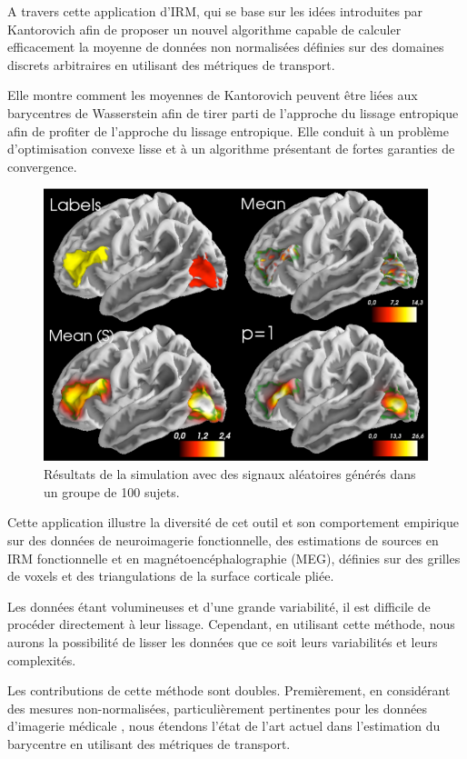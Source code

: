 \documentclass[
    8.2pt,
    a4paper,
    logo,
    twocolumn
]{template}
\begin{document}
    A travers cette application d’IRM, qui se base sur les idées introduites par Kantorovich \citep{KR:58} afin de proposer un nouvel algorithme capable de calculer efficacement la moyenne de données non normalisées définies sur des domaines discrets arbitraires en utilisant des métriques de transport.

    Elle montre comment les moyennes de Kantorovich peuvent être liées aux barycentres de Wasserstein \citep{agueh_barycenters_2011} afin de tirer parti de l'approche du lissage entropique \citep{cuturi_fast_2014} afin de profiter de l'approche du lissage entropique. Elle conduit à un problème d'optimisation convexe lisse et à un algorithme présentant de fortes garanties de convergence.

    \begin{figure}[H]
        \centering
        \includegraphics[width=.5\textwidth]{figures/image11.png}
        \caption{Résultats de la simulation avec des signaux aléatoires générés dans un groupe de 100 sujets.}
        \label{fig:figureh}
    \end{figure}

    Cette application illustre la diversité de cet outil et son comportement empirique sur des données de neuroimagerie fonctionnelle, des estimations de sources en IRM fonctionnelle et en magnétoencéphalographie (MEG), définies sur des grilles de voxels et des triangulations de la surface corticale pliée.

    Les données étant volumineuses et d’une grande variabilité, il est difficile de procéder directement à leur lissage. Cependant, en utilisant cette méthode, nous aurons la possibilité de lisser les données que ce soit leurs variabilités et leurs complexités.

    Les contributions de cette méthode sont doubles. Premièrement, en considérant des mesures non-normalisées, particulièrement pertinentes pour les données d'imagerie médicale \citep{thirion_analysis_2007}, nous étendons l'état de l'art actuel dans l'estimation du barycentre en utilisant des métriques de transport.
\end{document}
